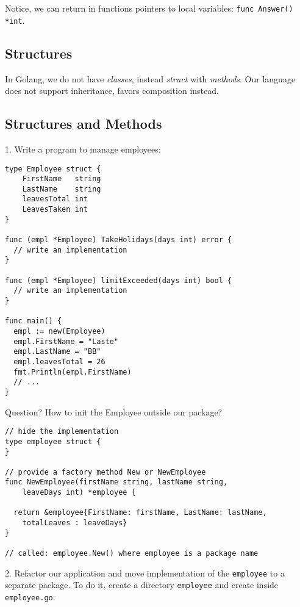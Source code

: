 \documentclass[11pt, letterpaper]{article}
\begin{document}
Notice, we can return in functions pointers to local variables: \texttt{func Answer() *int}.

\subsection{Structures}

In Golang, we do not have \emph{classes}, instead \emph{struct} with \emph{methods}. Our language does not support inheritance, favors composition instead. 

\subsection{Structures and Methods}

1. Write a program to manage employees:

\begin{verbatim}
type Employee struct {  
    FirstName   string
    LastName    string
    leavesTotal int
    LeavesTaken int
}

func (empl *Employee) TakeHolidays(days int) error {
  // write an implementation
} 

func (empl *Employee) limitExceeded(days int) bool {
  // write an implementation
}

func main() {
  empl := new(Employee)
  empl.FirstName = "Laste"
  empl.LastName = "BB"
  empl.leavesTotal = 26
  fmt.Println(empl.FirstName)
  // ...
}
\end{verbatim}

\bigskip

Question? How to init the Employee outside our package?

\begin{verbatim}
// hide the implementation
type employee struct {  
}

// provide a factory method New or NewEmployee
func NewEmployee(firstName string, lastName string,
    leaveDays int) *employee {
  
  return &employee{FirstName: firstName, LastName: lastName,
    totalLeaves : leaveDays}
}

// called: employee.New() where employee is a package name 
\end{verbatim}

\bigskip

2. Refactor our application and move implementation of the \verb|employee| to a separate package. To do it, create a directory \verb|employee| and create inside \verb|employee.go|:
\end{document}
